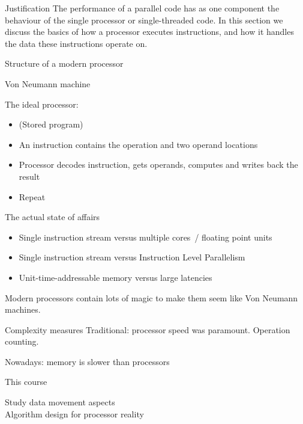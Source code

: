 
\begin{numberedframe}{Justification}
The performance of a parallel code has as one component
the behaviour of the single processor or single-threaded code. 
In this section we discuss the basics of how a processor
executes instructions, and how it handles the data
these instructions operate on.
\end{numberedframe}

 {Structure of a modern processor}

\begin{numberedframe}{Von Neumann machine}

The ideal processor:
\begin{itemize}
\item (Stored program)
\item An instruction contains the operation and two operand locations
\item Processor decodes instruction, gets operands, computes and writes back the result
\item Repeat
\end{itemize}

\end{numberedframe}

\begin{numberedframe}{The actual state of affairs}

  \begin{itemize}
  \item Single instruction stream versus multiple cores~/ floating point units
  \item Single instruction stream versus Instruction Level Parallelism
  \item Unit-time-addressable memory versus large latencies
  \end{itemize}
  Modern processors contain lots of magic to make them seem like Von Neumann machines.
\end{numberedframe}

\begin{numberedframe}{Complexity measures}
  Traditional: processor speed was paramount. Operation counting.

  Nowadays: memory is slower than processors 

    \begin{block}{This course}

      Study data movement aspects\\
      Algorithm design for processor reality
    \end{block}
\end{numberedframe}


